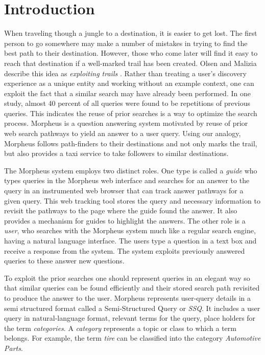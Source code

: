 \section{Introduction}



When traveling though a jungle to a destination, it is easier to get
lost.  The first person to go somewhere may make a number of mistakes
in trying to find the best path to their destination.  However, those
who come later will find it easy to reach that destination if a
well-marked trail has been created. Olsen and Malizia describe this
idea as \emph{exploiting trails} \cite{5379671}.  Rather than treating
a user's discovery experience as a unique entity and working without an example
context, one can exploit the fact that a similar search may have already been
performed.  In one study, almost 40 percent of all queries
were found to be repetitions of previous queries\cite{1277770}. This
indicates the reuse of prior searches is a way to optimize the search
process.  Morpheus is a question answering system motivated by reuse of prior
web search pathways to yield an answer to a user query. Using our analogy,
Morpheus follows path-finders to their destinations and not only marks the
trail, but also provides a taxi service to take followers to similar
destinations.

The Morpheus system employs two distinct roles. One type is called a
\textit{guide} who types queries in the Morpheus web interface and
searches for an answer to the query in an instrumented web browser that can
track answer pathways for a given query. This web tracking tool stores the query
and necessary information to revisit the pathways to the page where the guide 
found the answer. It also provides a mechanism for guides to highlight the answers.
The other role is a \textit{user}, who searches with the Morpheus system much
like a regular search engine, having a natural language interface. The users type a
question in a text box and receive a response from the system. The system
exploits previously answered queries to these answer new questions.

To exploit the prior searches one should represent queries in an elegant way so
that similar queries can be found efficiently and their stored search path
revisited to produce the answer to the user. Morpheus represents user-query details
in a semi structured format called a Semi-Structured Query or \textit{SSQ}. It
includes a user query in natural-language format, relevant terms for the query,
place holders for the term \textit{categories}. A \textit{category} represents a
topic or class to which a term belongs. For example, the term \textit{tire} can be
classified into the category \textit{Automotive Parts}.

